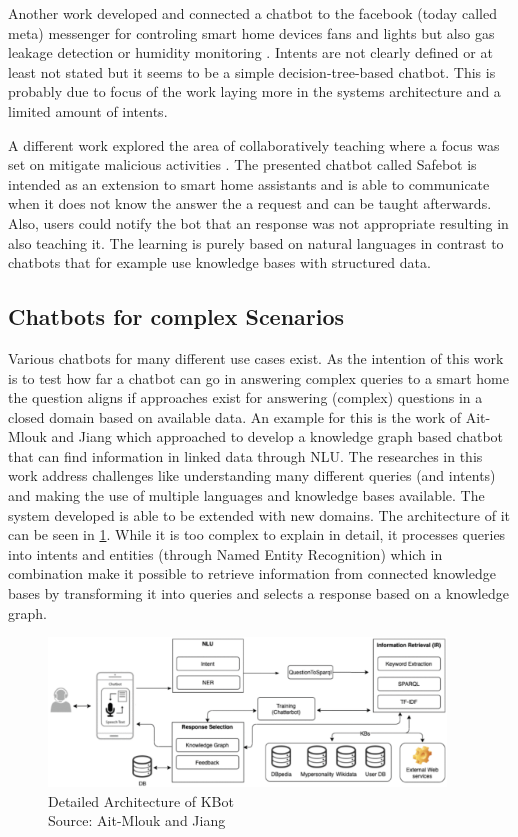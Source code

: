 Another work developed and connected a chatbot to the facebook (today called meta) messenger for controling smart home devices fans and lights but also gas leakage detection or humidity monitoring \cite{ahmed_smart_2020}.
Intents are not clearly defined or at least not stated but it seems to be a simple decision-tree-based chatbot.
This is probably due to focus of the work laying more in the systems architecture and a limited amount of intents.

A different work explored the area of collaboratively teaching where a focus was set on mitigate malicious activities \cite{chkroun_safe_2021}.
The presented chatbot called Safebot is intended as an extension to smart home assistants and is able to communicate when it does not know the answer the a request and can be taught afterwards.
Also, users could notify the bot that an response was not appropriate resulting in also teaching it.
The learning is purely based on natural languages in contrast to chatbots that for example use knowledge bases with structured data.

\subsection*{Chatbots for complex Scenarios}
Various chatbots for many different use cases exist. 
As the intention of this work is to test how far a chatbot can go in answering complex queries to a smart home the question aligns if approaches exist for answering (complex) questions in a closed domain based on available data.
An example for this is the work of Ait-Mlouk and Jiang \cite{ait-mlouk_kbot_2020} which approached to develop a knowledge graph based chatbot that can find information in linked data through NLU.
The researches in this work address challenges like understanding many different queries (and intents) and making the use of multiple languages and knowledge bases available.
The system developed is able to be extended with new domains.
The architecture of it can be seen in \cref{fig:kbot}.
While it is too complex to explain in detail, it processes queries into intents and entities (through Named Entity Recognition) which in combination make it possible to retrieve information from connected knowledge bases by transforming it into queries and selects a response based on a knowledge graph.

\begin{figure}[h]
\centering
\includegraphics[width=0.94\textwidth]{graphics/KBot-architecture.png}
\caption{Detailed Architecture of KBot \\Source: Ait-Mlouk and Jiang \cite{ait-mlouk_kbot_2020}}
\label{fig:kbot}
\end{figure}


